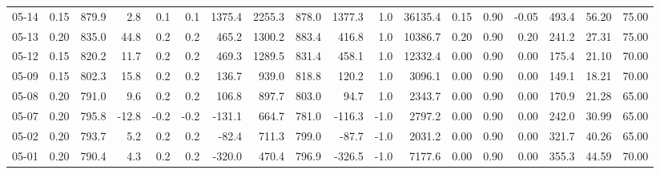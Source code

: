 \begin{threeparttable}
{\begin{tabular}{lrrrrrrrrrrrrrrrrr}
  05-14 &     0.15 & 879.9 &               2.8 &               0.1 &                0.1 &             1375.4 & 2255.3 & 878.0 &     1377.3 &                      1.0 &             36135.4 &       0.15 &      0.90 &          -0.05 &            493.4 &           56.20 &                  75.00 \\
  05-13 &     0.20 & 835.0 &              44.8 &               0.2 &                0.2 &              465.2 & 1300.2 & 883.4 &      416.8 &                      1.0 &             10386.7 &       0.20 &      0.90 &           0.20 &            241.2 &           27.31 &                  75.00 \\
  05-12 &     0.15 & 820.2 &              11.7 &               0.2 &                0.2 &              469.3 & 1289.5 & 831.4 &      458.1 &                      1.0 &             12332.4 &       0.00 &      0.90 &           0.00 &            175.4 &           21.10 &                  70.00 \\
  05-09 &     0.15 & 802.3 &              15.8 &               0.2 &                0.2 &              136.7 &  939.0 & 818.8 &      120.2 &                      1.0 &              3096.1 &       0.00 &      0.90 &           0.00 &            149.1 &           18.21 &                  70.00 \\
  05-08 &     0.20 & 791.0 &               9.6 &               0.2 &                0.2 &              106.8 &  897.7 & 803.0 &       94.7 &                      1.0 &              2343.7 &       0.00 &      0.90 &           0.00 &            170.9 &           21.28 &                  65.00 \\
  05-07 &     0.20 & 795.8 &             -12.8 &              -0.2 &               -0.2 &             -131.1 &  664.7 & 781.0 &     -116.3 &                     -1.0 &              2797.2 &       0.00 &      0.90 &           0.00 &            242.0 &           30.99 &                  65.00 \\
  05-02 &     0.20 & 793.7 &               5.2 &               0.2 &                0.2 &              -82.4 &  711.3 & 799.0 &      -87.7 &                     -1.0 &              2031.2 &       0.00 &      0.90 &           0.00 &            321.7 &           40.26 &                  65.00 \\
  05-01 &     0.20 & 790.4 &               4.3 &               0.2 &                0.2 &             -320.0 &  470.4 & 796.9 &     -326.5 &                     -1.0 &              7177.6 &       0.00 &      0.90 &           0.00 &            355.3 &           44.59 &                  70.00 \\

\end{tabular}}
\end{threeparttable}
